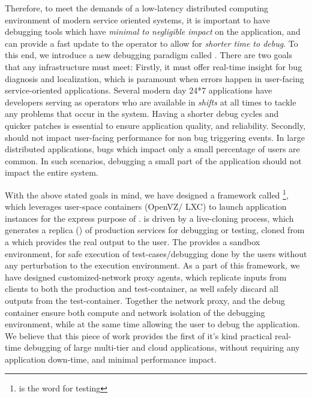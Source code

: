 Therefore, to meet the demands of a low-latency distributed computing environment of modern service oriented systems, it is important to have debugging tools which have \textit{minimal to negligible impact} on the application, and can provide a fast update to the operator to allow for \textit{shorter time to debug}.
To this end, we introduce a new debugging paradigm called \livedebugging.
There are two goals that any \livedebugging infrastructure must meet:
Firstly, it must offer real-time insight for bug diagnosis and localization, which is paramount when errors happen in user-facing service-oriented applications. 
Several modern day 24*7 applications have developers serving as operators who are available in \textit{shifts} at all times to tackle any problems that occur in the system.
Having a shorter debug cycles and quicker patches is essential to ensure application quality, and reliability.
Secondly, \livedebugging should not impact user-facing performance for non bug triggering events.
In large distributed applications, bugs which impact only a small percentage of users are common. 
In such scenarios, debugging a small part of the application should not impact the entire system.

With the above stated goals in mind, we have designed a framework called \parikshan\footnote{\parikshan is the \toolNameLang word for  testing}, which leverages user-space containers (OpenVZ/ LXC) to launch application instances for the express purpose of \livedebugging. 
\parikshan is driven by a  live-cloning process, which generates a replica (\debugcontainer) of production services for debugging or testing, cloned from a \productioncontainer which provides the real output to the user.
The \debugcontainer provides a sandbox environment, for safe execution of test-cases/debugging done by the users without any perturbation to the execution environment.
As a part of this framework, we have designed customized-network proxy agents, which replicate inputs from clients to both the production and test-container, as well safely discard all outputs from the test-container.
Together the network proxy, and the debug container ensure both compute and network isolation of the debugging environment, while at the same time allowing the user to debug the application.
We believe that this piece of work provides the first of it's kind practical real-time debugging of large multi-tier and cloud applications, without requiring any application down-time, and minimal performance impact.


